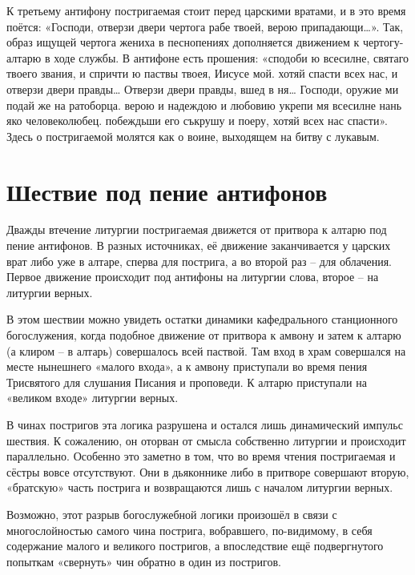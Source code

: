 К третьему антифону постригаемая стоит перед царскими вратами, и в это время поётся: «Господи, отверзи двери чертога рабе твоей, верою припадающи\ldots{}».
Так, образ ищущей чертога жениха в песнопениях дополняется движением к чертогу-алтарю в ходе службы.
В антифоне есть прошения: «сподоби ю всесилне, святаго твоего звания, и спричти ю паствы твоея, Иисусе мой. хотяй спасти всех нас, и отверзи двери правды\ldots{} Отверзи двери правды, вшед в ня\ldots{} Господи, оружие ми подай же на ратоборца. верою и надеждою и любовию укрепи мя всесилне нань яко человеколюбец. побеждьши его съкрушу и поеру, хотяй всех нас спасти».
Здесь о постригаемой молятся как о воине, выходящем на битву с лукавым.

\section*{Шествие под пение антифонов}\label{ux434ux432ux438ux436ux435ux43dux438ux435-ux432ux43e-ux432ux440ux435ux43cux44f-ux430ux43dux442ux438ux444ux43eux43dux43eux432}

Дважды втечение литургии постригаемая движется от притвора к алтарю под пение антифонов.
В разных источниках, её движение заканчивается у царских врат либо уже в алтаре, сперва для пострига, а во второй раз -- для облачения.
Первое движение происходит под антифоны на литургии слова, второе -- на литургии верных.

В этом шествии можно увидеть остатки динамики кафедрального станционного богослужения, когда подобное движение от притвора к амвону и затем к алтарю (а клиром -- в алтарь) совершалось всей паствой.
Там вход в храм совершался на месте нынешнего «малого входа», а к амвону приступали во время пения Трисвятого для слушания Писания и проповеди.
К алтарю приступали на «великом входе» литургии верных.

В чинах постригов эта логика разрушена и остался лишь динамический импульс шествия.
К сожалению, он оторван от смысла собственно литургии и происходит параллельно.
Особенно это заметно в том, что во время чтения постригаемая и сёстры вовсе отсутствуют.
Они в дьяконнике либо в притворе совершают вторую, «братскую» часть пострига и возвращаются лишь с началом литургии верных.

Возможно, этот разрыв богослужебной логики произошёл в связи с многослойностью самого чина пострига, вобравшего, по-видимому, в себя содержание малого и великого постригов, а впоследствие ещё подвергнутого попыткам «свернуть» чин обратно в один из постригов.

